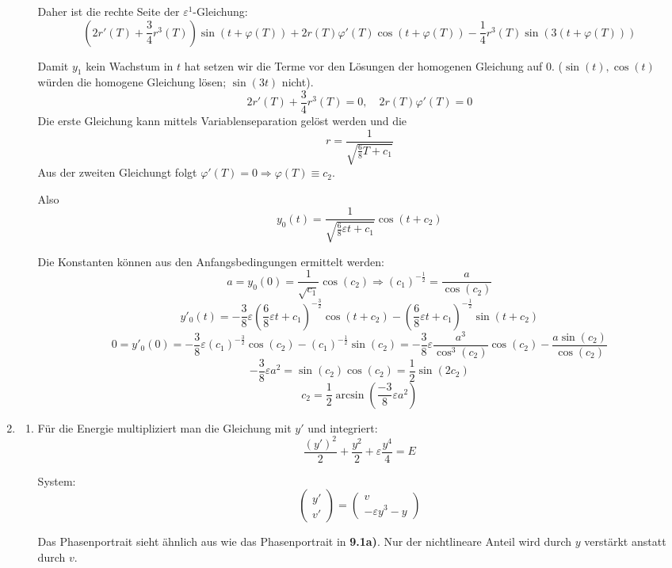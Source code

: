 \documentclass[a4paper,11pt]{scrartcl}
\newcommand*{\eps}{\varepsilon}
\begin{document}
\begin{enumerate}[label*=\textbf{9.\arabic*.}]
\begin{enumerate}
    Daher ist die rechte Seite der $\eps^1$-Gleichung:
    \[\left(2r'(T) + \frac{3}{4} r^3(T)\right) \sin(t + \varphi(T)) + 2 r(T) \varphi'(T) \cos(t
     + \varphi(T)) - \frac{1}{4} r^3(T) \sin(3(t + \varphi(T))) \]

   Damit $y_1$ kein Wachstum in $t$ hat setzen wir die Terme vor den Lösungen der
   homogenen Gleichung auf 0.
   ($\sin(t), \cos(t)$ würden die homogene Gleichung lösen; $\sin(3t)$ nicht).
   \[ 2r'(T) + \frac{3}{4}r^3(T) = 0, \quad 2r(T)\varphi'(T) = 0\]
   Die erste Gleichung kann mittels Variablenseparation gelöst werden und die
   \[ r = \frac{1}{\sqrt{\frac{6}{8}T + c_1}}\]
   Aus der zweiten Gleichungt folgt $\varphi'(T) = 0 \Rightarrow \varphi(T) \equiv c_2$.

   Also
   \[y_0(t) = \frac{1}{\sqrt{\frac{6}{8}\eps t + c_1}} \cos(t + c_2)\]

   Die Konstanten können aus den Anfangsbedingungen ermittelt werden:
   \[a = y_0(0) = \frac{1}{\sqrt{c_1}} \cos(c_2) \Rightarrow
     (c_1)^{-\frac{1}{2}} = \frac{a}{\cos(c_2)}\]
   \[y'_0(t) = -\frac{3}{8}\eps \left(\frac{6}{8}\eps t +
       c_1\right)^{-\frac{3}{2}} \cos(t+c_2)- \left(\frac{6}{8}\eps t +
       c_1\right)^{-\frac{1}{2}} \sin(t + c_2)\]
   \[0 = y'_0(0) = -\frac{3}{8}\eps \left(c_1\right)^{-\frac{3}{2}} \cos(c_2)
     - \left(c_1\right)^{-\frac{1}{2}} \sin(c_2)
   = -\frac{3}{8} \eps \frac{a^3}{\cos^3(c_2)} \cos(c_2) - \frac{a\sin(c_2)}{\cos(c_2)}\]
 \[-\frac{3}{8} \eps a^2 = \sin(c_2)\cos(c_2) = \frac{1}{2}\sin(2c_2)\]
 \[c_2 = \frac{1}{2}\arcsin\left(\frac{-3}{8}\eps a^2\right)\]

\end{enumerate}


\item \begin{enumerate}
  \item
    Für die Energie multipliziert man die Gleichung mit $y'$ und integriert:
    \[\frac{(y')^2}{2} + \frac{y^2}{2} + \eps \frac{y^4}{4} = E\]

    System:
    \[\begin{pmatrix}y'\\v'\end{pmatrix}=
      \begin{pmatrix}v\\-\eps y^3 - y\end{pmatrix}
    \]

    Das Phasenportrait sieht ähnlich aus wie das Phasenportrait in
    \textbf{9.1a)}. Nur der nichtlineare Anteil wird durch $y$ verstärkt anstatt
    durch $v$.


\end{enumerate}
\end{enumerate}
\end{document}
